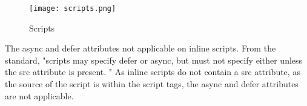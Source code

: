 \begin{figure}[h!]
\begin{center}
\texttt{[image: scripts.png]}
\caption{Scripts}
\label{img:latency}
\end{center}
\end{figure}


The async and defer attributes not applicable on inline scripts.
From the standard, "scripts may specify defer or async, but must not specify either unless the src attribute is present. " %
As inline scripts do not contain a src attribute, as the source of the script is within the script tags, the async and defer attributes are not applicable.





















